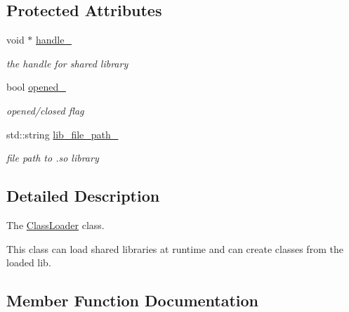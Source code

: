 \subsection*{Protected Attributes}
\begin{DoxyCompactItemize}
\item 
void $\ast$ \hyperlink{classow__plugin__loader_1_1ClassLoader_a85a929ab2f12298ff72b791ce816f899}{handle\+\_\+}\hypertarget{classow__plugin__loader_1_1ClassLoader_a85a929ab2f12298ff72b791ce816f899}{}\label{classow__plugin__loader_1_1ClassLoader_a85a929ab2f12298ff72b791ce816f899}

\begin{DoxyCompactList}\small\item\em the handle for shared library \end{DoxyCompactList}\item 
bool \hyperlink{classow__plugin__loader_1_1ClassLoader_aa9db3390561bd553d028577cbbcc29e3}{opened\+\_\+}\hypertarget{classow__plugin__loader_1_1ClassLoader_aa9db3390561bd553d028577cbbcc29e3}{}\label{classow__plugin__loader_1_1ClassLoader_aa9db3390561bd553d028577cbbcc29e3}

\begin{DoxyCompactList}\small\item\em opened/closed flag \end{DoxyCompactList}\item 
std\+::string \hyperlink{classow__plugin__loader_1_1ClassLoader_aa8cd75410bdc91e5ad2e7d0964ef32c5}{lib\+\_\+file\+\_\+path\+\_\+}\hypertarget{classow__plugin__loader_1_1ClassLoader_aa8cd75410bdc91e5ad2e7d0964ef32c5}{}\label{classow__plugin__loader_1_1ClassLoader_aa8cd75410bdc91e5ad2e7d0964ef32c5}

\begin{DoxyCompactList}\small\item\em file path to .so library \end{DoxyCompactList}\end{DoxyCompactItemize}


\subsection{Detailed Description}
The \hyperlink{classow__plugin__loader_1_1ClassLoader}{Class\+Loader} class. 

This class can load shared libraries at runtime and can create classes from the loaded lib. 

\subsection{Member Function Documentation}
